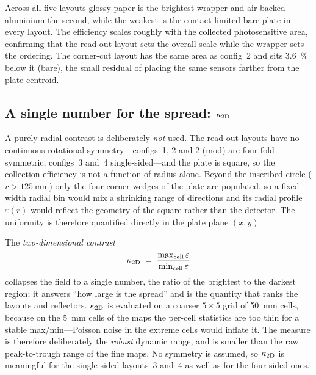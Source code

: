 \documentclass[11pt,a4paper]{article}
\begin{document}
Across all five layouts glossy paper is the brightest wrapper and air-backed
aluminium the second, while the weakest is the contact-limited bare plate in
every layout. The efficiency scales roughly with the collected photosensitive
area, confirming that the read-out layout sets the overall scale while the
wrapper sets the ordering. The corner-cut layout has the same area as
config~2 and sits \SI{3.6}{\percent} below it (bare), the small residual of
placing the same sensors farther from the plate centroid.

\subsection{A single number for the spread: \texorpdfstring{$\kappa_{\rm 2D}$}{kappa 2D}}

A purely radial contrast is deliberately \emph{not} used.  The read-out layouts
have no continuous rotational symmetry---configs~1, 2 and 2 (mod) are four-fold
symmetric, configs~3 and~4 single-sided---and the plate is square, so the
collection efficiency is not a function of radius alone.  Beyond the inscribed
circle ($r > \SI{125}{\milli\meter}$) only the four corner wedges of the plate
are populated, so a fixed-width radial bin would mix a shrinking range of
directions and its radial profile $\varepsilon(r)$ would reflect the geometry of
the square rather than the detector.  The uniformity is therefore quantified
directly in the plate plane $(x,y)$.

The \emph{two-dimensional contrast}
\begin{equation}
  \kappa_{\rm 2D} \;=\; \frac{\max_{\rm cell}\varepsilon}{\min_{\rm cell}\varepsilon}
\end{equation}
collapses the field to a single number, the ratio of the brightest to the
darkest region; it answers ``how large is the spread'' and is the quantity that
ranks the layouts and reflectors.  $\kappa_{\rm 2D}$ is evaluated on a coarser
$5\times5$ grid of \SI{50}{\milli\meter} cells, because on the
\SI{5}{\milli\meter} cells of the maps the per-cell statistics are too thin for
a stable max/min---Poisson noise in the extreme cells would inflate it.  The
measure is therefore deliberately the \emph{robust} dynamic range, and is
smaller than the raw peak-to-trough range of the fine maps.  No symmetry is
assumed, so
$\kappa_{\rm 2D}$ is meaningful for the single-sided layouts~3 and~4 as well as
for the four-sided ones.
\end{document}
